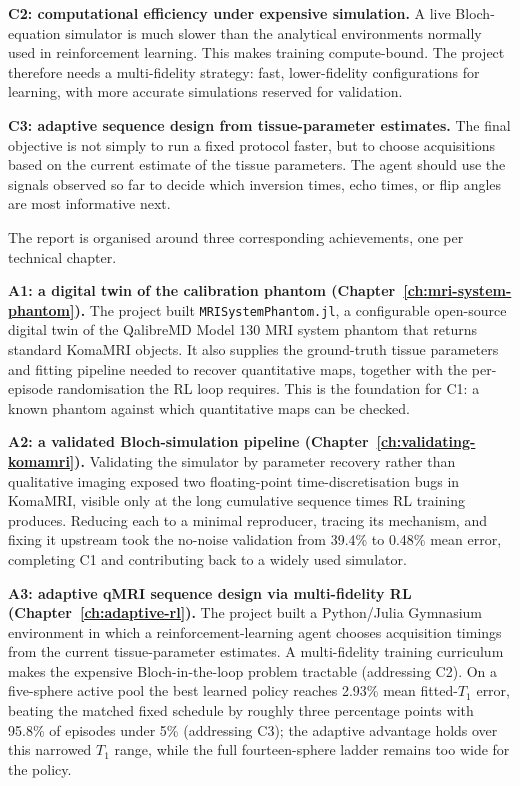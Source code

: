 \textbf{C2: computational efficiency under expensive simulation.} A live Bloch-equation simulator is much slower than the analytical environments normally used in reinforcement learning. This makes training compute-bound. The project therefore needs a multi-fidelity strategy: fast, lower-fidelity configurations for learning, with more accurate simulations reserved for validation.

\textbf{C3: adaptive sequence design from tissue-parameter estimates.} The final objective is not simply to run a fixed protocol faster, but to choose acquisitions based on the current estimate of the tissue parameters. The agent should use the signals observed so far to decide which inversion times, echo times, or flip angles are most informative next.

The report is organised around three corresponding achievements, one per technical chapter.

\textbf{A1: a digital twin of the calibration phantom
(Chapter~\ref{ch:mri-system-phantom}).} The project built
\texttt{MRISystemPhantom.jl}, a configurable open-source digital twin of the
QalibreMD Model 130 MRI system phantom that returns standard KomaMRI objects.
It also supplies the ground-truth tissue parameters and fitting pipeline needed
to recover quantitative maps, together with the per-episode randomisation the
RL loop requires. This is the foundation for C1: a known phantom
against which quantitative maps can be checked.

\textbf{A2: a validated Bloch-simulation pipeline
(Chapter~\ref{ch:validating-komamri}).} Validating the simulator by parameter recovery rather than qualitative imaging
exposed two floating-point time-discretisation bugs in KomaMRI, visible only at
the long cumulative sequence times RL training produces. Reducing each to a
minimal reproducer, tracing its mechanism, and fixing it upstream took the
no-noise validation from 39.4\% to 0.48\% mean error, completing C1 and
contributing back to a widely used simulator.

\textbf{A3: adaptive qMRI sequence design via multi-fidelity RL
(Chapter~\ref{ch:adaptive-rl}).} The project built a Python/Julia Gymnasium
environment in which a reinforcement-learning agent chooses acquisition
timings from the current tissue-parameter estimates. A multi-fidelity
training curriculum makes the expensive Bloch-in-the-loop problem tractable
(addressing C2). On a five-sphere active pool the best learned policy reaches
2.93\% mean fitted-$T_1$ error, beating the matched fixed schedule by roughly
three percentage points with 95.8\% of episodes under 5\% (addressing C3); the
adaptive advantage holds over this narrowed $T_1$ range, while the full
fourteen-sphere ladder remains too wide for the policy.

